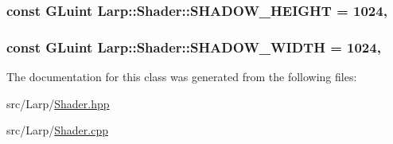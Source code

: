 \subsubsection[{\texorpdfstring{S\+H\+A\+D\+O\+W\+\_\+\+H\+E\+I\+G\+HT}{SHADOW_HEIGHT}}]{\setlength{\rightskip}{0pt plus 5cm}const G\+Luint Larp\+::\+Shader\+::\+S\+H\+A\+D\+O\+W\+\_\+\+H\+E\+I\+G\+HT = 1024\hspace{0.3cm}{\ttfamily [static]}, {\ttfamily [private]}}\hypertarget{classLarp_1_1Shader_aa37c97ad8e4b8e9bff61dc3c3c170155}{}\label{classLarp_1_1Shader_aa37c97ad8e4b8e9bff61dc3c3c170155}
\subsubsection[{\texorpdfstring{S\+H\+A\+D\+O\+W\+\_\+\+W\+I\+D\+TH}{SHADOW_WIDTH}}]{\setlength{\rightskip}{0pt plus 5cm}const G\+Luint Larp\+::\+Shader\+::\+S\+H\+A\+D\+O\+W\+\_\+\+W\+I\+D\+TH = 1024\hspace{0.3cm}{\ttfamily [static]}, {\ttfamily [private]}}\hypertarget{classLarp_1_1Shader_a330453400ea364bfcf40f0f4f881b64e}{}\label{classLarp_1_1Shader_a330453400ea364bfcf40f0f4f881b64e}


The documentation for this class was generated from the following files\+:\begin{DoxyCompactItemize}
\item 
src/\+Larp/\hyperlink{Shader_8hpp}{Shader.\+hpp}\item 
src/\+Larp/\hyperlink{Shader_8cpp}{Shader.\+cpp}\end{DoxyCompactItemize}
